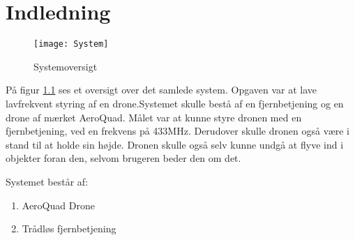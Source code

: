\documentclass[Main]{subfiles}
\begin{document}
\chapter{Indledning}

\begin{figure}[H]
\centering
\texttt{[image: System]}
\caption{Systemoversigt}
\label{Fig:System}
\end{figure}
På figur \ref{Fig:System} ses et oversigt over det samlede system. Opgaven var at lave lavfrekvent styring af en drone.Systemet skulle bestå af en fjernbetjening og en drone af mærket AeroQuad. Målet var at kunne styre dronen med en fjernbetjening, ved en frekvens på 433MHz. Derudover skulle dronen også være i stand til at holde sin højde. Dronen skulle også selv kunne undgå at flyve ind i objekter foran den, selvom brugeren beder den om det.

Systemet består af:
\begin{enumerate}
\item AeroQuad Drone
\item Trådløs fjernbetjening
\end{enumerate}
\end{document}
